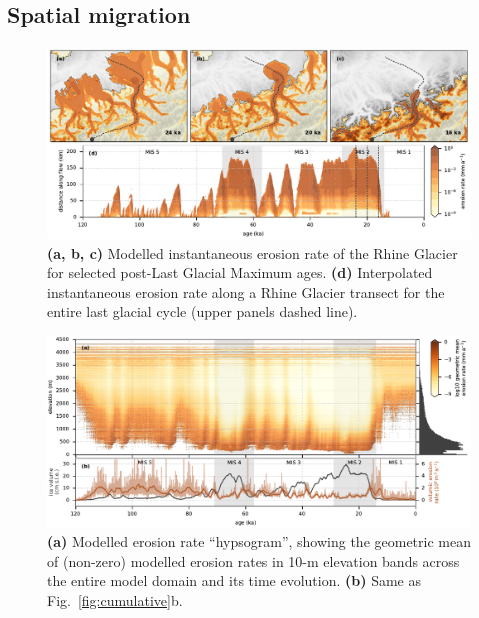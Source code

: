 \documentclass[esurf, manuscript]{copernicus}
\begin{document}
\subsection{Spatial migration}

    \begin{figure}[ht]
      \centerline{\includegraphics{alpero_transects}}
      \caption{%
        \textbf{(a, b, c)} Modelled instantaneous erosion rate of the Rhine
          Glacier for selected post-Last Glacial Maximum ages.
        \textbf{(d)} Interpolated instantaneous erosion rate along a Rhine
          Glacier transect for the entire last glacial cycle (upper panels
          dashed line).}
      \label{fig:transects}
    \end{figure}

    \begin{figure}[ht]
      \centerline{\includegraphics{alpero_hypsogram}}
      \caption{%
        \textbf{(a)} Modelled erosion rate ``hypsogram'', showing the geometric
          mean of (non-zero) modelled erosion rates in 10-m elevation bands
          across the entire model domain and its time evolution.
        \textbf{(b)} Same as Fig.~\ref{fig:cumulative}b.}
      \label{fig:hypsogram}
    \end{figure}
\end{document}
